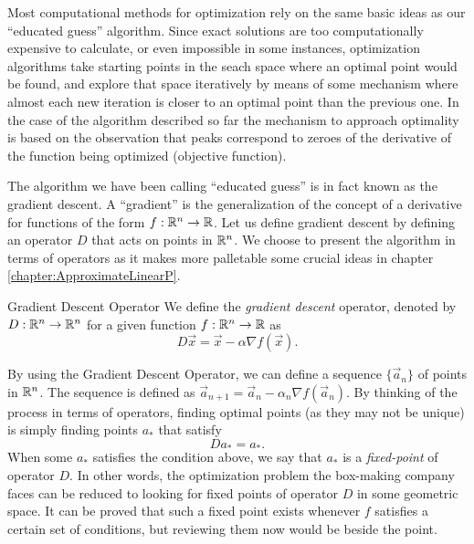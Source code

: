 Most computational methods for optimization rely on the same basic ideas as our
``educated guess'' algorithm. Since exact solutions are too computationally
expensive to calculate, or even impossible in some instances, optimization
algorithms take starting points in the seach space where an optimal point would
be found, and explore that space iteratively by means of some mechanism where
almost each new iteration is closer to an optimal point than the previous one.
In the case of the algorithm described so far the mechanism to approach
optimality is based on the observation that peaks correspond to zeroes of the
derivative of the function being optimized (objective function).

The algorithm we have been calling ``educated guess'' is in fact known as the
gradient descent. A ``gradient'' is the generalization of the concept of a
derivative for functions of the form $f: \mathbb{R}^{n} \to \mathbb{R}$. Let us define gradient
descent by defining an operator $D$ that acts on points in $\mathbb{R}^{n}$. We choose
to present the algorithm in terms of operators as it makes more palletable some
crucial ideas in chapter \ref{chapter:ApproximateLinearP}.

\begin{dfn}{Gradient Descent Operator}{}
    We define the \emph{gradient descent} operator, denoted by $D: \mathbb{R}^{n} \to
    \mathbb{R}^{n}$ for a given function $f: \mathbb{R}^{n} \to \mathbb{R}$ as
    \[
        D \vec{x} = \vec{x} - \alpha \nabla f(\vec{x}).
    \]
\end{dfn}

By using the Gradient Descent Operator, we can define a sequence
$\{\vec{a}_n\}$ of points in $\mathbb{R}^{n}$. The sequence is defined as
$\vec{a}_{n+1} = \vec{a}_n - \alpha_n \nabla f(\vec{a}_n)$. By thinking of the
process in terms of operators, finding optimal points (as they may not be
unique) is simply finding points $a_*$ that satisfy
\[
    D a_* = a_*.
\]
When some $a_*$ satisfies the condition above, we say that $a_*$ is a
\emph{fixed-point} of operator $D$. In other words, the optimization problem the
box-making company faces can be reduced to looking for fixed points of operator
$D$ in some geometric space. It can be proved that such a fixed point exists
whenever $f$ satisfies a certain set of conditions, but reviewing them now would
be beside the point. 

